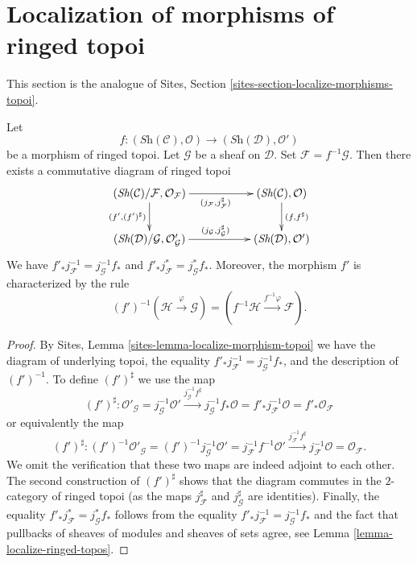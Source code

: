 \section{Localization of morphisms of ringed topoi}
\label{section-localize-morphisms-ringed-topoi}

\noindent
This section is the analogue of
Sites, Section \ref{sites-section-localize-morphisms-topoi}.

\begin{lemma}
\label{lemma-localize-morphism-ringed-topoi}
Let
$$
f :
(\textit{Sh}(\mathcal{C}), \mathcal{O})
\longrightarrow
(\textit{Sh}(\mathcal{D}), \mathcal{O}')
$$
be a morphism of ringed topoi. Let $\mathcal{G}$ be a sheaf on $\mathcal{D}$.
Set $\mathcal{F} = f^{-1}\mathcal{G}$.
Then there exists a commutative diagram of ringed topoi
$$
\xymatrix{
(\textit{Sh}(\mathcal{C})/\mathcal{F}, \mathcal{O}_{\mathcal{F}})
\ar[rr]_{(j_{\mathcal{F}}, j_{\mathcal{F}}^\sharp)}
\ar[d]_{(f', (f')^\sharp)} & &
(\textit{Sh}(\mathcal{C}), \mathcal{O}) \ar[d]^{(f, f^\sharp)} \\
(\textit{Sh}(\mathcal{D})/\mathcal{G}, \mathcal{O}'_{\mathcal{G}})
\ar[rr]^{(j_{\mathcal{G}}, j_{\mathcal{G}}^\sharp)} & &
(\textit{Sh}(\mathcal{D}), \mathcal{O}')
}
$$
We have $f'_*j_{\mathcal{F}}^{-1} = j_{\mathcal{G}}^{-1}f_*$
and $f'_*j_{\mathcal{F}}^* = j_{\mathcal{G}}^*f_*$. Moreover, the
morphism $f'$ is characterized by the rule
$$
(f')^{-1}(\mathcal{H} \xrightarrow{\varphi} \mathcal{G})
=
(f^{-1}\mathcal{H} \xrightarrow{f^{-1}\varphi} \mathcal{F}).
$$
\end{lemma}

\begin{proof}
By
Sites, Lemma \ref{sites-lemma-localize-morphism-topoi}
we have the diagram of underlying topoi, the
equality $f'_*j_{\mathcal{F}}^{-1} = j_{\mathcal{G}}^{-1}f_*$, and
the description of $(f')^{-1}$.
To define $(f')^\sharp$ we use the map
$$
(f')^\sharp :
\mathcal{O}'_{\mathcal{G}} =
j_{\mathcal{G}}^{-1} \mathcal{O}'
\xrightarrow{j_{\mathcal{G}}^{-1}f^\sharp}
j_{\mathcal{G}}^{-1} f_*\mathcal{O} =
f'_* j_{\mathcal{F}}^{-1}\mathcal{O} =
f'_* \mathcal{O}_{\mathcal{F}}
$$
or equivalently the map
$$
(f')^\sharp :
(f')^{-1}\mathcal{O}'_{\mathcal{G}} =
(f')^{-1}j_{\mathcal{G}}^{-1} \mathcal{O}' =
j_{\mathcal{F}}^{-1}f^{-1}\mathcal{O}'
\xrightarrow{j_{\mathcal{F}}^{-1}f^\sharp}
j_{\mathcal{F}}^{-1} \mathcal{O} =
\mathcal{O}_{\mathcal{F}}.
$$
We omit the verification that these two maps are indeed adjoint
to each other. The second construction of $(f')^\sharp$ shows that
the diagram commutes in the $2$-category of ringed topoi (as the
maps $j_{\mathcal{F}}^\sharp$ and $j_{\mathcal{G}}^\sharp$ are identities).
Finally, the equality $f'_*j_{\mathcal{F}}^* = j_{\mathcal{G}}^*f_*$
follows from the equality
$f'_*j_{\mathcal{F}}^{-1} = j_{\mathcal{G}}^{-1}f_*$
and the fact that pullbacks of sheaves of modules and sheaves of sets agree,
see
Lemma \ref{lemma-localize-ringed-topos}.
\end{proof}

